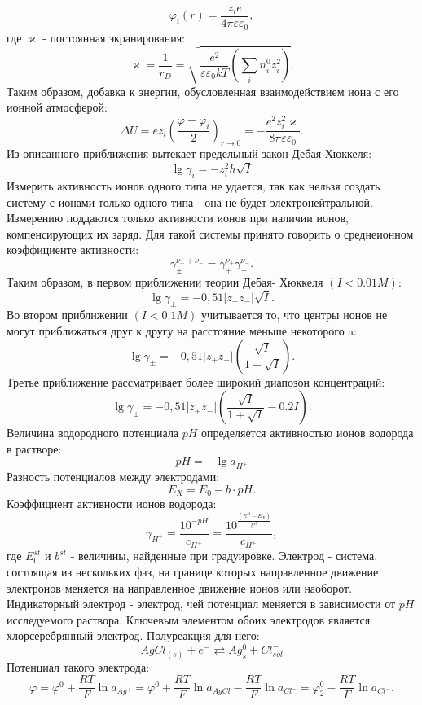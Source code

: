 \documentclass[a4paper, 12pt]{article}
\begin{document}
\[\varphi_i(r) = \frac{z_ie}{4\pi \varepsilon \varepsilon_0},\]
где $\varkappa  $ - постоянная экранирования: 
\[\varkappa   = \frac{1}{r_D} = \sqrt{\frac{e^2}{\varepsilon \varepsilon_0 kT} \left( \sum_i n_i^0z_i^2\right) }.\]
Таким образом, добавка
к энергии, обусловленная взаимодействием иона с его ионной атмосферой: 
\[\Delta U = ez_i\left(\frac{\varphi-\varphi_i}{2}\right)_{r\rightarrow 0} = -\frac{e^2z_i^2\varkappa  }
{8\pi\varepsilon\varepsilon_0}.\]
Из описанного приближения вытекает предельный закон Дебая-Хюккеля:
\begin{equation}
\lg{\gamma_i}=-z_i^2h\sqrt{I}
\end{equation}
Измерить активность ионов одного типа не удается, так как нельзя создать систему с ионами только
одного типа - она не будет электронейтральной. Измерению поддаются только активности ионов при наличии ионов, компенсирующих их заряд. Для такой системы принято говорить о среднеионном
коэффициенте активности: 
\[\gamma_\pm^{\nu_++\nu_-}= \gamma_+^{\nu_+}\gamma_-^{\nu_-}.\]
Таким образом, в первом приближении теории Дебая-
Хюккеля $(I<0.01M)$: 
\[\lg{\gamma_\pm} = -0,51\vert z_+z_-\vert \sqrt{I}.\] 
Во втором приближении $(I<0.1M)$ учитывается то, что центры ионов не могут приближаться друг к другу на расстояние меньше некоторого a: \[\lg{\gamma_\pm} = -0,51\vert z_+z_-\vert\left( \frac{\sqrt{I}}{1+\sqrt{I}}\right).\]
Третье приближение рассматривает более широкий диапозон концентраций: 
\[\lg{\gamma_\pm} = -0,51\vert z_+z_-\vert \left(\frac{\sqrt{I}}{1+\sqrt{I}}-0.2I\right).\]
Величина водородного потенциала $pH$ определяется активностью ионов
водорода в растворе:
\begin{equation}
pH = -\lg{a_{H^+}}
\end{equation}
Разность потенциалов между электродами: 
\[E_X = E_0 - b \cdot pH.\]
Коэффициент активности ионов водорода: 
\[\gamma_{H^+} = \frac{10^{-pH}}{c_{H^+}}
= \frac{10^{\frac{(E^{st}-E_X)}{b^{st}}}}{c_{H^+}},\]
где $E_0^{st}$ и $b^{st}$ - величины, найденные при градуировке. Электрод - система, состоящая из нескольких фаз, на границе которых направленное движение электронов
меняется на направленное движение ионов или наоборот. Индикаторный электрод - электрод, чей
потенциал меняется в зависимости от $pH$ исследуемого раствора. Ключевым элементом обоих электродов является хлорсеребрянный электрод. Полуреакция для него:
\begin{equation}
AgCl_{(s)} + e^- \rightleftarrows  Ag_s^0 + Cl_{sol}^-
\end{equation}
Потенциал такого электрода: 
\[\varphi = \varphi^0 + \frac{RT}{F} \ln{a_{Ag^+}} =\varphi^0 + \frac{RT}{F} \ln{a_{AgCl}} - \frac{RT}{F} \ln{a_{Cl^-}} = \varphi_2^0-\frac{RT}{F} \ln{a_{Cl^-}}.\]
\end{document}
